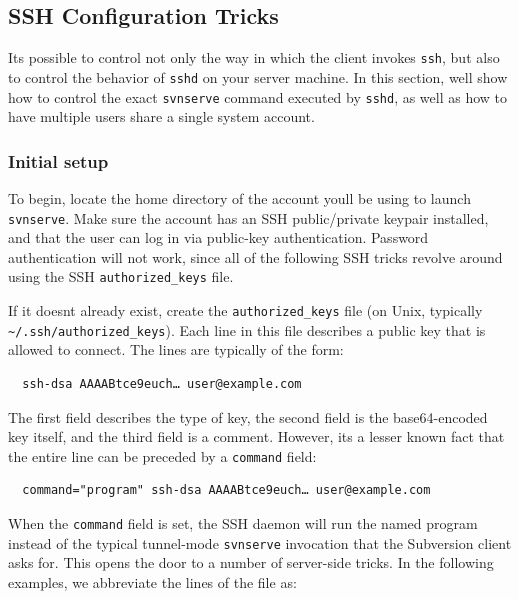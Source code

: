 \subsection{SSH Configuration
Tricks}\label{svn.serverconfig.svnserve.sshtricks}

It\textquotesingle s possible to control not only the way in which the
client invokes \texttt{ssh}, but also to control the behavior of
\texttt{sshd} on your server machine. In this section,
we\textquotesingle ll show how to control the exact \texttt{svnserve}
command executed by \texttt{sshd}, as well as how to have multiple users
share a single system account.

\subsubsection{Initial
setup}\label{svn.serverconfig.svnserve.sshtricks.setup}

To begin, locate the home directory of the account
you\textquotesingle ll be using to launch \texttt{svnserve}. Make sure
the account has an SSH public/private keypair installed, and that the
user can log in via public-key authentication. Password authentication
will not work, since all of the following SSH tricks revolve around
using the SSH \texttt{authorized\_keys} file.

If it doesn\textquotesingle t already exist, create the
\texttt{authorized\_keys} file (on Unix, typically
\texttt{\textasciitilde{}/.ssh/authorized\_keys}). Each line in this
file describes a public key that is allowed to connect. The lines are
typically of the form:

\begin{verbatim}
  ssh-dsa AAAABtce9euch… user@example.com
\end{verbatim}

The first field describes the type of key, the second field is the
base64-encoded key itself, and the third field is a comment. However,
it\textquotesingle s a lesser known fact that the entire line can be
preceded by a \texttt{command} field:

\begin{verbatim}
  command="program" ssh-dsa AAAABtce9euch… user@example.com
\end{verbatim}

When the \texttt{command} field is set, the SSH daemon will run the
named program instead of the typical tunnel-mode \texttt{svnserve}
invocation that the Subversion client asks for. This opens the door to a
number of server-side tricks. In the following examples, we abbreviate
the lines of the file as:

